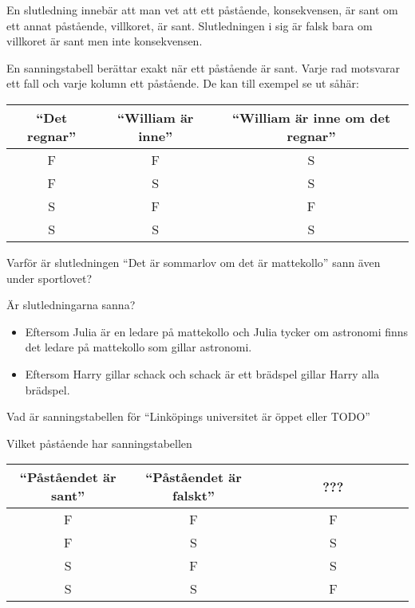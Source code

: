 \begin{definition}[Slutledning]
	En slutledning innebär att man vet att ett påstående, konsekvensen, är sant om ett annat påstående, villkoret, är sant. Slutledningen i sig är falsk bara om villkoret är sant men inte konsekvensen.
\end{definition}

\begin{definition}[Sanningstabell] %
	En sanningstabell berättar exakt när ett påstående är sant. Varje rad motsvarar ett fall och varje kolumn ett påstående. De kan till exempel se ut såhär:
	\begin{center}
		\begin{tabular}{|c|c|c|}
			\hline
			``Det regnar'' & ``William är inne'' & ``William är inne om det regnar'' \\ \hline
			F & F & S \\ \hline
			F & S & S \\ \hline
			S & F & F \\ \hline
			S & S & S \\ \hline
		\end{tabular}
	\end{center}
\end{definition}

\begin{problem}
	Varför är slutledningen ``Det är sommarlov om det är mattekollo'' sann även under sportlovet?
\end{problem}

\begin{problem}
	Är slutledningarna sanna?
	\begin{itemize}
		\item Eftersom Julia är en ledare på mattekollo och Julia tycker om astronomi finns det ledare på mattekollo som gillar astronomi.
		\item Eftersom Harry gillar schack och schack är ett brädspel gillar Harry alla brädspel.
	\end{itemize}
\end{problem}

\begin{problem}
	Vad är sanningstabellen för ``Linköpings universitet är öppet eller TODO''
\end{problem}

\begin{problem}
	Vilket påstående har sanningstabellen
	\begin{center}
		\begin{tabular}{|c|c|c|}
			\hline
			``Påståendet är sant'' & ``Påståendet är falskt'' & ~~~~~~~~???~~~~~~~~ \\ \hline
			F & F & F \\ \hline
			F & S & S \\ \hline
			S & F & S \\ \hline
			S & S & F \\ \hline
		\end{tabular}
	\end{center}
\end{problem}

